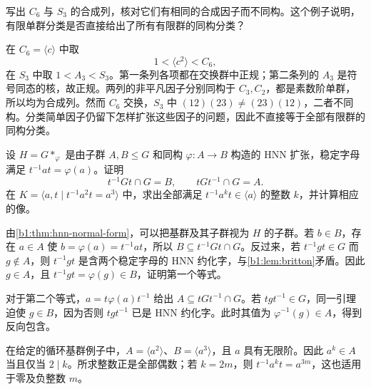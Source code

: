\begin{exercise}\label{b1:ex:C-composition-not-classification}
	写出 \(C_6\) 与 \(S_3\) 的合成列，核对它们有相同的合成因子而不同构。这个例子说明，有限单群分类是否直接给出了所有有限群的同构分类？
\end{exercise}

\begin{solution}
	在 \(C_6=\langle c\rangle\) 中取
	\[
		1<\langle c^2\rangle<C_6,
	\]
	在 \(S_3\) 中取 \(1<A_3<S_3\)。第一条列各项都在交换群中正规；第二条列的 \(A_3\) 是符号同态的核，故正规。两列的非平凡因子分别同构于 \(C_3,C_2\)，都是素数阶单群，所以均为合成列。然而 \(C_6\) 交换，\(S_3\) 中 \((12)(23)\ne(23)(12)\)，二者不同构。分类简单因子仍留下怎样扩张这些因子的问题，因此不直接等于全部有限群的同构分类。
\end{solution}

\begin{exercise}\label{b1:ex:C-hnn-conjugate-intersections}
	设 \(H=G*_{\varphi}\) 是由子群 \(A,B\le G\) 和同构 \(\varphi:A\rightarrow B\) 构造的 HNN 扩张，稳定字母满足 \(t^{-1}at=\varphi(a)\)。证明
	\[
		t^{-1}Gt\cap G=B,\qquad tGt^{-1}\cap G=A.
	\]
	在 \(K=\langle a,t\mid t^{-1}a^2t=a^3\rangle\) 中，求出全部满足 \(t^{-1}a^kt\in\langle a\rangle\) 的整数 \(k\)，并计算相应的像。
\end{exercise}
\begin{solution}
	由\cref{b1:thm:hnn-normal-form}，可以把基群及其子群视为 \(H\) 的子群。若 \(b\in B\)，存在 \(a\in A\) 使 \(b=\varphi(a)=t^{-1}at\)，所以 \(B\subseteq t^{-1}Gt\cap G\)。反过来，若 \(t^{-1}gt\in G\) 而 \(g\notin A\)，则 \(t^{-1}gt\) 是含两个稳定字母的 HNN 约化字，与\cref{b1:lem:britton}矛盾。因此 \(g\in A\)，且 \(t^{-1}gt=\varphi(g)\in B\)，证明第一个等式。

	对于第二个等式，\(a=t\varphi(a)t^{-1}\) 给出 \(A\subseteq tGt^{-1}\cap G\)。若 \(tgt^{-1}\in G\)，同一引理迫使 \(g\in B\)，因为否则 \(tgt^{-1}\) 已是 HNN 约化字。此时其值为 \(\varphi^{-1}(g)\in A\)，得到反向包含。

	在给定的循环基群例子中，\(A=\langle a^2\rangle\)、\(B=\langle a^3\rangle\)，且 \(a\) 具有无限阶。因此 \(a^k\in A\) 当且仅当 \(2\mid k\)。所求整数正是全部偶数；若 \(k=2m\)，则 \(t^{-1}a^kt=a^{3m}\)，这也适用于零及负整数 \(m\)。
\end{solution}

